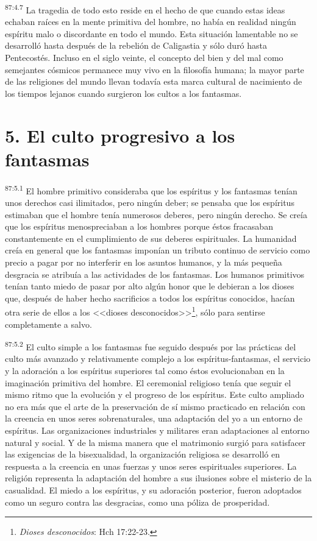 \par
\textsuperscript{87:4.7} La tragedia de todo esto reside en el hecho de que cuando estas ideas echaban raíces en la mente primitiva del hombre, no había en realidad ningún espíritu malo o discordante en todo el mundo. Esta situación lamentable no se desarrolló hasta después de la rebelión de Caligastia y sólo duró hasta Pentecostés. Incluso en el siglo veinte, el concepto del bien y del mal como semejantes cósmicos permanece muy vivo en la filosofía humana; la mayor parte de las religiones del mundo llevan todavía esta marca cultural de nacimiento de los tiempos lejanos cuando surgieron los cultos a los fantasmas.

\section*{5. El culto progresivo a los fantasmas}
\par
\textsuperscript{87:5.1} El hombre primitivo consideraba que los espíritus y los fantasmas tenían unos derechos casi ilimitados, pero ningún deber; se pensaba que los espíritus estimaban que el hombre tenía numerosos deberes, pero ningún derecho. Se creía que los espíritus menospreciaban a los hombres porque éstos fracasaban constantemente en el cumplimiento de sus deberes espirituales. La humanidad creía en general que los fantasmas imponían un tributo continuo de servicio como precio a pagar por no interferir en los asuntos humanos, y la más pequeña desgracia se atribuía a las actividades de los fantasmas. Los humanos primitivos tenían tanto miedo de pasar por alto algún honor que le debieran a los dioses que, después de haber hecho sacrificios a todos los espíritus conocidos, hacían otra serie de ellos a los <<dioses desconocidos>>\footnote{\textit{Dioses desconocidos}: Hch 17:22-23.}, sólo para sentirse completamente a salvo.

\par
\textsuperscript{87:5.2} El culto simple a los fantasmas fue seguido después por las prácticas del culto más avanzado y relativamente complejo a los espíritus-fantasmas, el servicio y la adoración a los espíritus superiores tal como éstos evolucionaban en la imaginación primitiva del hombre. El ceremonial religioso tenía que seguir el mismo ritmo que la evolución y el progreso de los espíritus. Este culto ampliado no era más que el arte de la preservación de sí mismo practicado en relación con la creencia en unos seres sobrenaturales, una adaptación del yo a un entorno de espíritus. Las organizaciones industriales y militares eran adaptaciones al entorno natural y social. Y de la misma manera que el matrimonio surgió para satisfacer las exigencias de la bisexualidad, la organización religiosa se desarrolló en respuesta a la creencia en unas fuerzas y unos seres espirituales superiores. La religión representa la adaptación del hombre a sus ilusiones sobre el misterio de la casualidad. El miedo a los espíritus, y su adoración posterior, fueron adoptados como un seguro contra las desgracias, como una póliza de prosperidad.

